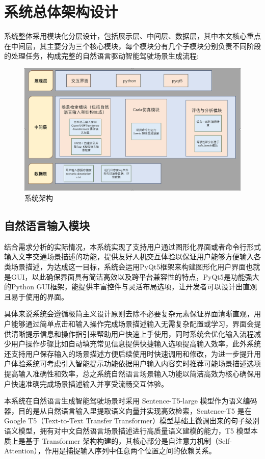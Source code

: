 \section{系统总体架构设计}
系统整体采用模块化分层设计，包括展示层、中间层、数据层，其中本文核心重点在中间层，其主要分为三个核心模块，每个模块分有几个子模块分别负责不同阶段的处理任务，构成完整的自然语言驱动智能驾驶场景生成流程:
\begin{figure}[H]
	\centering
	\includegraphics[width=1.0\textwidth]{images/系统架构图1.png}
	\caption{系统架构}
	\label{fig:system-architecture}
\end{figure}
\subsection{自然语言输入模块}
结合需求分析的实际情况，本系统实现了支持用户通过图形化界面或者命令行形式输入文字交通场景描述的功能，提供友好人机交互体验以保证用户能够方便输入各类场景描述，为达成这一目标，系统会运用PyQt5框架来构建图形化用户界面也就是GUI，以此确保界面具有简洁高效以及跨平台兼容性的特点，PyQt5是功能强大的Python GUI框架，能提供丰富控件与灵活布局选项，让开发者可以设计出直观且易于使用的界面。

具体来说系统会遵循极简主义设计原则去除不必要复杂元素保证界面清晰直观，用户能够通过简单点击和输入操作完成场景描述输入无需复杂配置或学习，界面会提供清晰提示信息和操作指引来帮助用户快速上手使用，同时系统会优化输入流程减少用户操作步骤比如自动填充常见信息提供快捷输入选项提高输入效率，此外系统还支持用户保存输入的场景描述方便后续使用时快速调用和修改，为进一步提升用户体验系统可考虑引入智能提示功能依据用户输入内容实时推荐可能场景描述选项提高输入准确性和效率，总之系统自然语言场景输入功能以简洁高效为核心确保用户快速准确完成场景描述输入并享受流畅交互体验。

本系统在自然语言生成智能驾驶场景时采用 Sentence-T5-large 模型作为语义编码器，目的是从自然语言输入里提取语义向量并实现高效检索，Sentence-T5 是在 Google T5（Text-to-Text Transfer Transformer）模型基础上微调出来的句子级别语义模型，拥有对中文自然语言场景描述进行高质量语义建模的能力，T5 模型本质上是基于 Transformer 架构构建的，其核心部分是自注意力机制（Self-Attention），作用是捕捉输入序列中任意两个位置之间的依赖关系。

